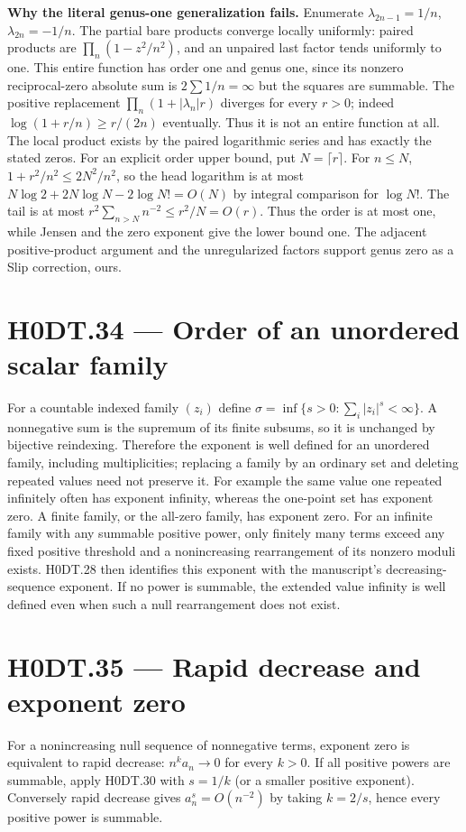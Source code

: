 \textbf{Why the literal genus-one generalization fails.} Enumerate $\lambda_{2n-1}=1/n$, $\lambda_{2n}=-1/n$. The partial bare products converge locally uniformly: paired products are $\prod_n(1-z^2/n^2)$, and an unpaired last factor tends uniformly to one. This entire function has order one and genus one, since its nonzero reciprocal-zero absolute sum is $2\sum1/n=\infty$ but the squares are summable. The positive replacement $\prod_n(1+|\lambda_n|r)$ diverges for every $r>0$; indeed $\log(1+r/n)\ge r/(2n)$ eventually. Thus it is not an entire function at all. The local product exists by the paired logarithmic series and has exactly the stated zeros. For an explicit order upper bound, put $N=\lceil r\rceil$. For $n\le N$, $1+r^2/n^2\le2N^2/n^2$, so the head logarithm is at most $N\log2+2N\log N-2\log N!=O(N)$ by integral comparison for $\log N!$. The tail is at most $r^2\sum_{n>N}n^{-2}\le r^2/N=O(r)$. Thus the order is at most one, while Jensen and the zero exponent give the lower bound one. The adjacent positive-product argument and the unregularized factors support genus zero as a Slip correction, ours.

\section*{H0DT.34 --- Order of an unordered scalar family}
For a countable indexed family $(z_i)$ define $\sigma=\inf\{s>0:\sum_i|z_i|^s<\infty\}$. A nonnegative sum is the supremum of its finite subsums, so it is unchanged by bijective reindexing. Therefore the exponent is well defined for an unordered family, including multiplicities; replacing a family by an ordinary set and deleting repeated values need not preserve it. For example the same value one repeated infinitely often has exponent infinity, whereas the one-point set has exponent zero. A finite family, or the all-zero family, has exponent zero. For an infinite family with any summable positive power, only finitely many terms exceed any fixed positive threshold and a nonincreasing rearrangement of its nonzero moduli exists. H0DT.28 then identifies this exponent with the manuscript's decreasing-sequence exponent. If no power is summable, the extended value infinity is well defined even when such a null rearrangement does not exist.

\section*{H0DT.35 --- Rapid decrease and exponent zero}
For a nonincreasing null sequence of nonnegative terms, exponent zero is equivalent to rapid decrease: $n^k a_n\to0$ for every $k>0$. If all positive powers are summable, apply H0DT.30 with $s=1/k$ (or a smaller positive exponent). Conversely rapid decrease gives $a_n^s=O(n^{-2})$ by taking $k=2/s$, hence every positive power is summable.

